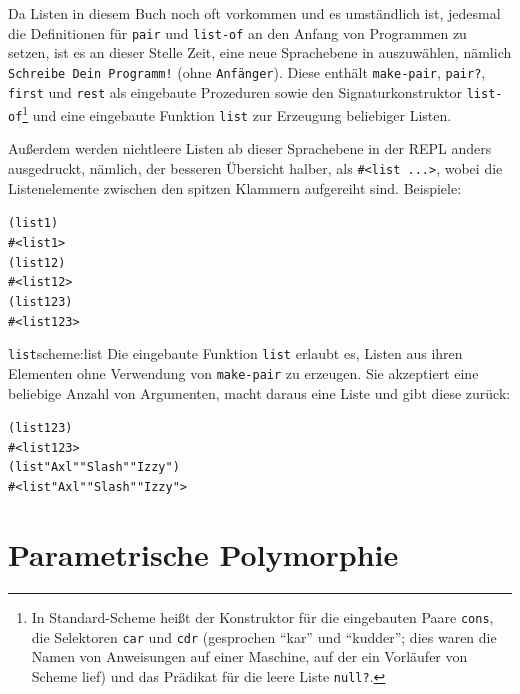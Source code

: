Da Listen in diesem Buch noch oft vorkommen und es umständlich
ist, jedesmal die Definitionen für \texttt{pair} und \texttt{list-of} an den Anfang
von Programmen zu setzen, ist es an dieser Stelle Zeit, eine neue
Sprachebene in \drscheme{} auszuwählen, nämlich \texttt{Schreibe Dein Programm!}
(ohne \texttt{Anfänger}).  Diese enthält \texttt{make-pair},
\texttt{pair?}, \texttt{first} und \texttt{rest} als eingebaute
Prozeduren sowie den Signaturkonstruktor \texttt{list-of}\footnote{In Standard-Scheme heißt der Konstruktor für
  die eingebauten Paare \texttt{cons}, die
  Selektoren \texttt{car} und \texttt{cdr}
  (gesprochen "`kar"' und "`kudder"'; dies waren die Namen von Anweisungen auf einer
  Maschine, auf der ein Vorläufer von Scheme lief) und das Prädikat
  für die leere Liste \texttt{null?}.} und eine
eingebaute Funktion \texttt{list} zur Erzeugung beliebiger Listen.

Außerdem werden nichtleere Listen ab dieser Sprachebene in der REPL
anders ausgedruckt, nämlich, der besseren Übersicht halber, als
\verb|#<list ...>|,
wobei die Listenelemente zwischen den spitzen Klammern aufgereiht sind.
Beispiele:

\begin{alltt}
(list 1)
\evalsto{} #<list 1>
(list 1 2)
\evalsto{} #<list 1 2>
(list 1 2 3)
\evalsto{} #<list 1 2 3>
\end{alltt}
%
\begin{feature}{\texttt{list}}{scheme:list}
  Die eingebaute Funktion \texttt{list} erlaubt es, Listen aus ihren Elementen
  ohne Verwendung von \texttt{make-pair} zu erzeugen.  Sie
  akzeptiert eine beliebige Anzahl von Argumenten, macht daraus eine
  Liste und gibt diese zurück:
%
\begin{alltt}
(list 1 2 3)
\evalsto{} #<list 1 2 3>
(list "Axl" "Slash" "Izzy")
\evalsto{} #<list "Axl" "Slash" "Izzy">
\end{alltt}
\end{feature}


\section{Parametrische Polymorphie}
\label{sec:parametric-polymorphism}
\label{sec:more-lists}

